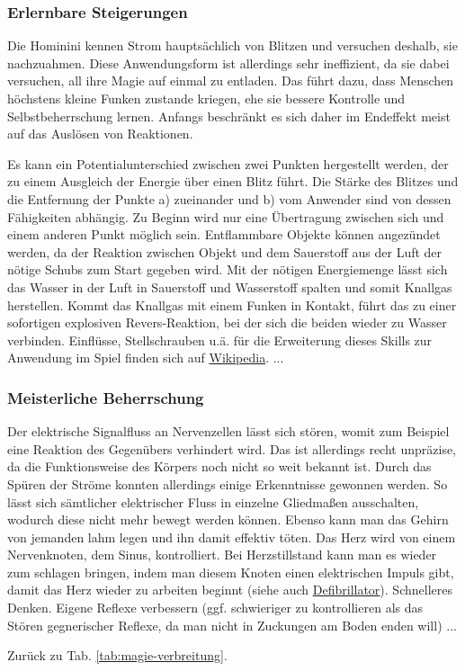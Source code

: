 \subsubsection{Erlernbare Steigerungen}
Die Hominini kennen Strom hauptsächlich von Blitzen und versuchen deshalb, sie nachzuahmen. 
Diese Anwendungsform ist allerdings sehr ineffizient, da sie dabei versuchen, all ihre Magie auf einmal zu entladen. 
Das führt dazu, dass Menschen höchstens kleine Funken zustande kriegen, ehe sie bessere Kontrolle und Selbstbeherrschung lernen.
Anfangs beschränkt es sich daher im Endeffekt meist auf das Auslösen von Reaktionen.
\begin{outline}
	\1 Es kann ein Potentialunterschied zwischen zwei Punkten hergestellt werden, der zu einem Ausgleich der Energie über einen Blitz führt.
	Die Stärke des Blitzes und die Entfernung der Punkte a) zueinander und b) vom Anwender sind von dessen Fähigkeiten abhängig.
	Zu Beginn wird nur eine Übertragung zwischen sich und einem anderen Punkt möglich sein.
	\1 Entflammbare Objekte können angezündet werden, da der Reaktion zwischen Objekt und dem Sauerstoff aus der Luft der nötige Schubs zum Start gegeben wird.
	\1 Mit der nötigen Energiemenge lässt sich das Wasser in der Luft in Sauerstoff und Wasserstoff spalten und somit Knallgas herstellen.
	Kommt das Knallgas mit einem Funken in Kontakt, führt das zu einer sofortigen explosiven Revers-Reaktion, bei der sich die beiden wieder zu Wasser verbinden.
	Einflüsse, Stellschrauben u.ä. für die Erweiterung dieses Skills zur Anwendung im Spiel finden sich \zB auf \href{https://de.wikipedia.org/wiki/Knallgas}{Wikipedia}.
	\1 ...
\end{outline}

\subsubsection{Meisterliche Beherrschung} 
\begin{outline}
	\1 Der elektrische Signalfluss an Nervenzellen lässt sich stören, womit zum Beispiel eine Reaktion des Gegenübers verhindert wird. 
	Das ist allerdings recht unpräzise, da die Funktionsweise des Körpers noch nicht so weit bekannt ist. 
	Durch das Spüren der Ströme konnten allerdings einige Erkenntnisse gewonnen werden. 
	So lässt sich \zB sämtlicher elektrischer Fluss in einzelne Gliedmaßen ausschalten, wodurch diese nicht mehr bewegt werden können.
	\1 Ebenso kann man das Gehirn von jemanden lahm legen und ihn damit effektiv töten.
	\1 Das Herz wird von einem Nervenknoten, dem Sinus, kontrolliert. 
	Bei Herzstillstand kann man es wieder zum schlagen bringen, indem man diesem Knoten einen elektrischen Impuls gibt, damit das Herz wieder zu arbeiten beginnt (siehe auch \href{https://de.wikipedia.org/wiki/Defibrillator}{Defibrillator}).
	\1 Schnelleres Denken.
	\1 Eigene Reflexe verbessern (ggf. schwieriger zu kontrollieren als das Stören gegnerischer Reflexe, da man nicht in Zuckungen am Boden enden will)
	\1 ...
\end{outline}
Zurück zu Tab. \ref{tab:magie-verbreitung}.



